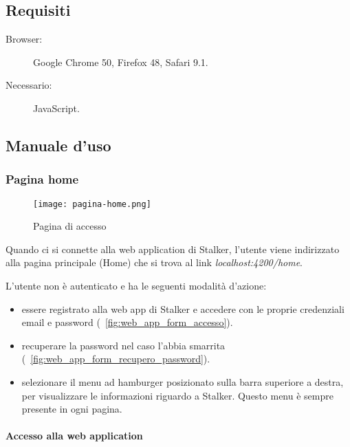 \documentclass[../manuale-utente.tex]{subfiles}
\begin{document}
\subsection{Requisiti}%
\label{sub:web_app_requisiti}

\begin{description}
    \item[Browser:] Google Chrome 50, Firefox 48, Safari 9.1.
    \item[Necessario:] JavaScript.
\end{description}
\newpage

\subsection{Manuale d'uso}%
\label{sub:manuale-uso-web}

\subsubsection{Pagina home}%
\label{subs:pagina_home}

\begin{figure}[H]
    \centering
    \texttt{[image: pagina-home.png]}
    \caption{Pagina di accesso}%
    \label{fig:web_app_pagina_accesso}
\end{figure}

Quando ci si connette alla web application di Stalker, l'utente viene indirizzato alla pagina principale (Home) che si trova al link \textit{localhost:4200/home}.

L'utente non è autenticato e ha le seguenti modalità d'azione:
\begin{itemize}
    \item essere registrato alla web app di Stalker e accedere con le proprie credenziali email e password (~\ref{fig:web_app_form_accesso}).
    \item recuperare la password nel caso l'abbia smarrita (~\ref{fig:web_app_form_recupero_password}).
    \item selezionare il menu ad hamburger posizionato sulla barra superiore a destra, per visualizzare le informazioni riguardo a Stalker. Questo menu è sempre presente in ogni pagina.
\end{itemize}
\newpage

\paragraph{Accesso alla web application}%
\label{par:accesso_alla_web_application}
\end{document}
